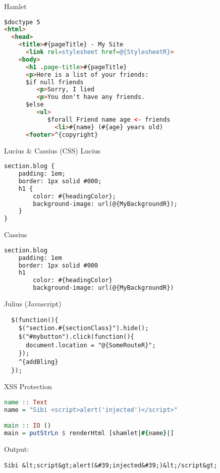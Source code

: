 \documentclass{beamer}
\begin{document}
\begin{frame}[fragile]{Hamlet}
\begin{lstlisting}[language=html,basicstyle=\small]
$doctype 5
<html>
  <head>
    <title>#{pageTitle} - My Site
      <link rel=stylesheet href=@{StylesheetR}>
    <body>
      <h1 .page-title>#{pageTitle}
      <p>Here is a list of your friends:
      $if null friends
         <p>Sorry, I lied
         <p>You don't have any friends.
      $else
         <ul>
            $forall Friend name age <- friends
              <li>#{name} (#{age} years old)
      <footer>^{copyright}
\end{lstlisting}

\end{frame}
\begin{frame}[fragile]{Lucius \& Cassius (CSS)}
  Lucius
  \begin{lstlisting}[language=html,basicstyle=\small]
section.blog {
    padding: 1em;
    border: 1px solid #000;
    h1 {
        color: #{headingColor};
        background-image: url(@{MyBackgroundR});
    }
}
\end{lstlisting}
Cassius
\begin{lstlisting}[language=html,basicstyle=\small]
section.blog
    padding: 1em
    border: 1px solid #000
    h1
        color: #{headingColor}
        background-image: url(@{MyBackgroundR})  
  \end{lstlisting}
\end{frame}

\begin{frame}[fragile]{Julius (Javascript)}
  \begin{lstlisting}
  $(function(){
    $("section.#{sectionClass}").hide();
    $("#mybutton").click(function(){
      document.location = "@{SomeRouteR}";
    });
    ^{addBling}
  });
  \end{lstlisting}
\end{frame}

\begin{frame}[fragile]{XSS Protection}
\begin{lstlisting}[language=haskell]
name :: Text
name = "Sibi <script>alert('injected')</script>"

main :: IO ()
main = putStrLn $ renderHtml [shamlet|#{name}|]
\end{lstlisting}

Output:
\begin{lstlisting}[basicstyle=\tiny]
Sibi &lt;script&gt;alert(&#39;injected&#39;)&lt;/script&gt;
\end{lstlisting}
\end{frame}
\end{document}
